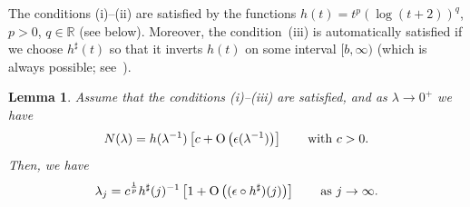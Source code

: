 \documentclass[10pt, a4paper]{amsart}
\newcommand{\R}{\mathbb{R}}
\newcommand{\op}{\operatorname}
\numberwithin{equation}{section}
\newtheorem{lemma}[theorem]{Lemma}
\theoremstyle{definition}
\theoremstyle{remark}
\begin{document}
The conditions (i)--(ii) are satisfied by the functions $h(t)=t^p(\log (t+2))^q$, $p>0$, $q\in \R$ (see below). Moreover, the condition~(iii) is automatically satisfied if we choose $h^\sharp(t)$ so that it inverts $h(t)$ on some interval $[b,\infty)$ (which is always possible; see~\cite[Remark~B.2]{PT:Part1}).

\begin{lemma}\label{lem:app.Ntolambda1}
Assume that the conditions (i)--(iii) are satisfied, and as $ \lambda\rightarrow 0^+$ we have
\begin{equation*}
 N(\lambda)= h(\lambda^{-1}) \left[ c+\op{O}\left(\epsilon(\lambda^{-1})\right)\right]  \qquad \textup{with}\ c>0. 
\end{equation*}
Then,  we have
\begin{equation}\label{eq:case c>0 result}
 \lambda_j=c^{\frac1p} h^\sharp(j)^{-1} \left[ 1+\op{O}\left((\epsilon \circ h^\sharp)(j)\right)\right] \qquad \textup{as}\ j\rightarrow \infty.
\end{equation}
\end{lemma}
\end{document}
